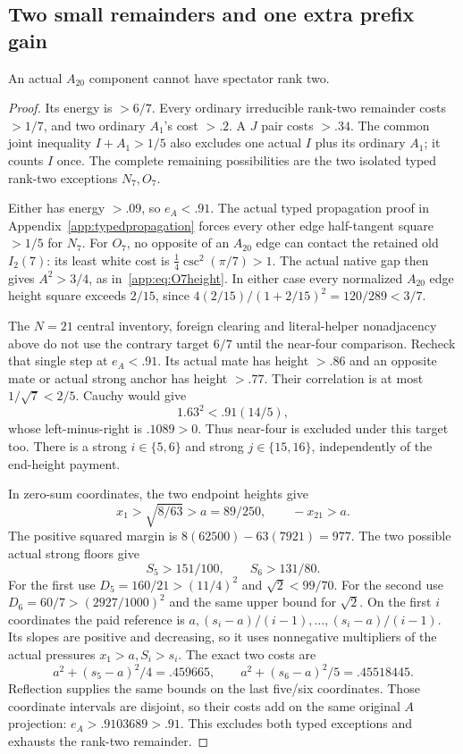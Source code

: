 \subsection{Two small remainders and one extra prefix gain}
\label{app:tail:smallremainders}
\begin{lemma}
\label{app:tail:lem:A20ranktwo}
An actual $A_{20}$ component cannot have spectator rank two.
\end{lemma}
\begin{proof}
Its energy is $>6/7$. Every ordinary irreducible rank-two remainder
costs $>1/7$, and two ordinary $A_1$'s cost $>.2$. A $J$ pair
costs $>.34$. The common joint inequality $I+A_1>1/5$ also
excludes one actual $I$ plus its ordinary $A_1$; it counts $I$ once.
The complete remaining possibilities are the two isolated typed
rank-two exceptions $N_7,O_7$.

Either has energy $>.09$, so $e_A<.91$. The actual typed
propagation proof in Appendix~\ref{app:typedpropagation} forces
every other edge half-tangent square $>1/5$ for $N_7$.
For $O_7$, no opposite of an $A_{20}$ edge can contact the
retained old $I_2(7)$: its least white cost is
$\tfrac14\csc^2(\pi/7)>1$. The actual native gap then gives
$A^2>3/4$, as in~\eqref{app:eq:O7height}. In either case every
normalized $A_{20}$ edge height square exceeds $2/15$, since
$4(2/15)/(1+2/15)^2=120/289<3/7$.

The $N=21$ central inventory, foreign clearing and literal-helper
nonadjacency above do not use the contrary target $6/7$ until
the near-four comparison. Recheck that single step at $e_A<.91$.
Its actual mate has height $>.86$ and an opposite mate or actual
strong anchor has height $>.77$. Their correlation is at most
$1/\sqrt7<2/5$. Cauchy would give
\[
 1.63^2<.91(14/5),
\]
whose left-minus-right is $.1089>0$. Thus near-four is excluded
under this target too. There is a strong $i\in\{5,6\}$ and
strong $j\in\{15,16\}$, independently of the end-height payment.

In zero-sum coordinates, the two endpoint heights give
\[
 x_1>\sqrt{8/63}>a=89/250,\qquad -x_{21}>a.
\]
The positive squared margin is $8(62500)-63(7921)=977$.
The two possible actual strong floors give
\[
 S_5>151/100,\qquad S_6>131/80.
\]
For the first use $D_5=160/21>(11/4)^2$ and $\sqrt2<99/70$.
For the second use $D_6=60/7>(2927/1000)^2$ and the same
upper bound for $\sqrt2$. On the first $i$ coordinates the paid
reference is $a,(s_i-a)/(i-1),\ldots,(s_i-a)/(i-1)$.
Its slopes are positive and decreasing, so it uses nonnegative
multipliers of the actual pressures $x_1>a,S_i>s_i$.
The exact two costs are
\[
 a^2+(s_5-a)^2/4=.459665,\qquad
 a^2+(s_6-a)^2/5=.45518445.
\]
Reflection supplies the same bounds on the last five/six coordinates.
Those coordinate intervals are disjoint, so their costs add on the
same original $A$ projection: $e_A>.9103689>.91$.
This excludes both typed exceptions and exhausts the rank-two remainder.
\end{proof}

